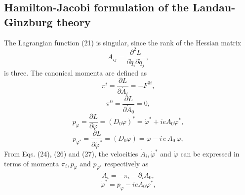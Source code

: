 \documentclass[12pt]{article}
\begin{document}
\subsection {Hamilton-Jacobi formulation of the Landau-Ginzburg theory} 

\indent The Lagrangian function (21) is singular, since
the rank of the Hessian matrix
\begin{equation}\label{23}
A_{ij}=\dfrac{\partial^{2}L}{\partial{\dot{q}}_{i}
\partial{\dot{q}}_{j}}\,,
\end{equation}is three. The canonical momenta are defined as
\begin{equation}\label{24}
\pi^{i}=\frac{\partial L}{\partial {\dot{A}}_{i}}=-F^{0i},
\end{equation}
\begin{equation}\label{25}
\pi^{0}= \frac{\partial L}{\partial{\dot{A}}_{0}}=0,
\end{equation}
\begin{equation}\label{26}
p_{\varphi}= \frac{\partial L}{\partial
\dot{\varphi}}=(D_{0}\varphi)^{\ast}=\dot{\varphi}^{\ast}+ieA_{0}\varphi^{\ast},
\end{equation}
\begin{equation}\label{27}
p_{\varphi^{\ast}}= \frac{\partial L}{\partial
{\dot{\varphi}}^{\ast}}=(D_{0}\varphi)=\dot{\varphi}-i\,e\,A_{0}\,\varphi,
\end{equation}
From Eqs. (24), (26) and (27), the velocities
${\dot{A}}_{i},{\dot{\varphi}}^{\ast}$ and $\dot{\varphi}$ can be
expressed in terms of momenta $\pi_{i}, p_{\varphi}$ and
$p_{\varphi^{\ast}}$ respectively as
\begin{equation}\label{28}
{\dot{A}}_{i}=-\pi_{i}-\partial_{i}A_{0},
\end{equation}
\begin{equation}\label{29}
{\dot{\varphi}}^{\ast}=p_{\varphi}-ieA_{0}{\varphi}^{\ast},
\end{equation}
\end{document}
